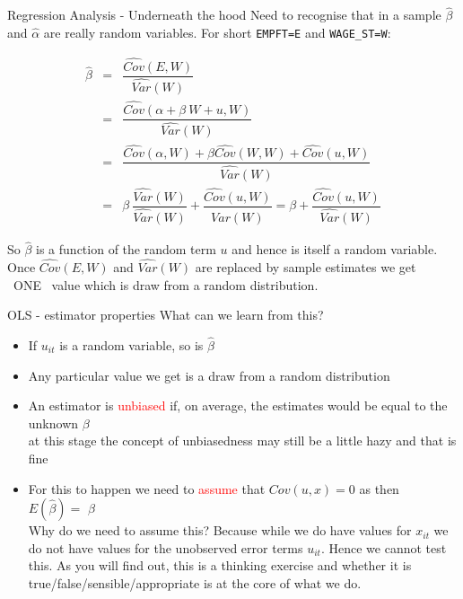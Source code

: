 \documentclass[
  ignorenonframetext,
]{beamer}
\begin{document}
\begin{frame}{Regression Analysis - Underneath the hood}
\protect\hypertarget{regression-analysis---underneath-the-hood}{}
Need to recognise that in a sample \(\hat{\beta}\) and \(\hat{\alpha}\)
are really \textcolor{student}{random variables}. For short
\texttt{EMPFT=E} and \texttt{WAGE\_ST=W}:

\begin{eqnarray*}
\hat{\beta} &=& \dfrac{\widehat{Cov}(E,W)}{\widehat{Var}(W)}\\
          &=&\dfrac{\widehat{Cov}(\alpha + \beta~ W + u,W)}{\widehat{Var}(W)}\\
          &=&\dfrac{\widehat{Cov}(\alpha,W) + \beta \widehat{Cov}(W,W) + \widehat{Cov}(u,W)}{\widehat{Var}(W)}\\
          &=& \beta ~\dfrac{\widehat{Var}(W)}{\widehat{Var}(W)}  + \dfrac{\widehat{Cov}(u,W)}{\widehat{Var}(W)}= \beta  + \dfrac{\widehat{Cov}(u,W)}{\widehat{Var}(W)}
\end{eqnarray*}

So \(\hat{\beta}\) is a function of the random term \(u\) and hence is
itself a random variable. Once \(\widehat{Cov}(E,W)\) and
\(\widehat{Var}(W)\) are replaced by sample estimates we get
\textcolor{student}{~ONE~} value which is draw from a
\textcolor{student}{random distribution.}
\end{frame}

\begin{frame}{OLS - estimator properties}
\protect\hypertarget{ols---estimator-properties}{}
What can we learn from this?

\begin{itemize}
  \item If $u_{it}$ is a random variable, so is \textcolor{student}{ $\widehat{\beta}$}
  \item Any particular value we get is a \textcolor{student}{draw from a random distribution}
  \item An estimator is \textcolor{red}{unbiased} if, on average, the estimates would be equal to the unknown $\beta$\\
  \textcolor{student}{at this stage the concept of unbiasedness may still be a little hazy and that is fine}
  \item For this to happen we need to \textcolor{red}{assume} that $Cov(u,x)=0$ as then \\
        $E(\widehat{\beta})=$ \textcolor{student}{$\beta$}\\
        \textcolor{student}{Why do we need to assume this? Because while we do have values for $x_{it}$ we do not have values for the unobserved error terms $u_{it}$. Hence we cannot test this. As you will find out, this is a thinking exercise and whether it is true/false/sensible/appropriate is at the core of what we do.}
\end{itemize}
\end{frame}
\end{document}
